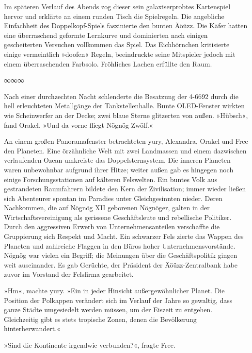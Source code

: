 Im späteren Verlauf des Abends zog dieser sein galaxiserprobtes Kartenspiel hervor und erklärte an einem runden Tisch die Spielregeln. Die angebliche Einfachheit des Doppelkopf-Spiels faszinierte den bunten Äöüzz. Die Käfer hatten eine überraschend geformte Lernkurve und dominierten nach einigen gescheiterten Versuchen vollkommen das Spiel. Das Eichhörnchen kritisierte einige vermeintlich »doofen« Regeln, beeindruckte seine Mitspieler jedoch mit einem überraschenden Farbsolo. Fröhliches Lachen erfüllte den Raum.

\begin{center}
∞∞∞
\end{center}

Nach einer durchzechten Nacht schlenderte die Besatzung der 4-6692 durch die hell erleuchteten Metallgänge der Tankstellenhalle. Bunte OLED-Fenster wirkten wie Scheinwerfer an der Decke; zwei blaue Sterne glitzerten von außen. »Hübsch«, fand Orakel. »Und da vorne fliegt Nögnög Zwölf.«

An einem großen Panoramafenster betrachteten yury, Alexandra, Orakel und Free den Planeten. Eine örzähnliche Welt mit zwei Landmassen und einem dazwischen verlaufenden Ozean umkreiste das Doppelsternsystem. Die inneren Planeten waren unbewohnbar aufgrund ihrer Hitze; weiter außen gab es hingegen noch einige Forschungsstationen auf kälteren Felswelten. Ein buntes Volk aus gestrandeten Raumfahrern bildete den Kern der Zivilisation; immer wieder ließen sich Abenteurer spontan im Paradies unter Gleichgesinnten nieder. Deren Nachkommen, die auf Nögnög XII geborenen Nögnöger, galten in der Wirtschaftsvereinigung als gerissene Geschäftsleute und rebellische Politiker. Durch den aggressiven Erwerb von Unternehmensanteilen verschaffte die Gruppierung sich Respekt und Macht. Ein schwarzer Fels zierte das Wappen des Planeten und zahlreiche Flaggen in den Büros hoher Unternehmensvorstände. Nögnög war vielen ein Begriff; die Meinungen über die Geschäftspolitik gingen weit auseinander. Es gab Gerüchte, der Präsident der Äöüzz-Zentralbank habe zuvor im Vorstand der Felsfirma gearbeitet.

»Hm«, machte yury. »Ein in jeder Hinsicht außergewöhnlicher Planet. Die Position der Polkappen verändert sich im Verlauf der Jahre so gewaltig, dass ganze Städte umgesiedelt werden müssen, um der Eiszeit zu entgehen. Gleichzeitig gibt es stets tropische Zonen, denen die Bevölkerung hinterherwandert.«

»Sind die Kontinente irgendwie verbunden?«, fragte Free.

